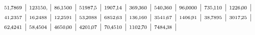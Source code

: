 \documentclass[12pt,fleqn]{article}
\theoremstyle{aufg}
\theoremstyle{bsp}
\begin{document}
\begin{flushleft}
$ \scriptstyle51,\hspace{-1pt}7869$ | $ \scriptstyle123150,\hspace{-1pt}$ | $ \scriptstyle86,\hspace{-1pt}1500$ | $ \scriptstyle51987,\hspace{-1pt}5$ | $ \scriptstyle1907,\hspace{-1pt}14$ | $ \scriptstyle369,\hspace{-1pt}360$ | $ \scriptstyle540,\hspace{-1pt}360$ | $ \scriptstyle96,\hspace{-1pt}0000$ | $ \scriptstyle735,\hspace{-1pt}110$ | $ \scriptstyle1226,\hspace{-1pt}00$ | $ \scriptstyle41,\hspace{-1pt}2357$ | $ \scriptstyle16,\hspace{-1pt}2488$ | $ \scriptstyle12,\hspace{-1pt}2591$ | $ \scriptstyle53,\hspace{-1pt}2088$ | $ \scriptstyle6852,\hspace{-1pt}63$ | $ \scriptstyle136,\hspace{-1pt}160$ | $ \scriptstyle3541,\hspace{-1pt}67$ | $ \scriptstyle1406,\hspace{-1pt}91$ | $ \scriptstyle38,\hspace{-1pt}7895$ | $ \scriptstyle3017,\hspace{-1pt}25$ | $ \scriptstyle62,\hspace{-1pt}4241$ | $ \scriptstyle58,\hspace{-1pt}4504$ | $ \scriptstyle4650,\hspace{-1pt}00$ | $ \scriptstyle4201,\hspace{-1pt}07$ | $ \scriptstyle70,\hspace{-1pt}4510$ | $ \scriptstyle1102,\hspace{-1pt}70$ | $ \scriptstyle7484,\hspace{-1pt}38$ | \end{flushleft} 
\end{document}
